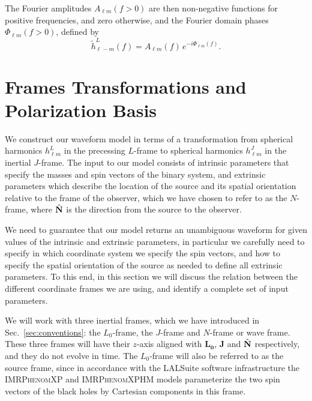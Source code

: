 \documentclass[%
aps,
prd,
amssymb,
amsmath,
amsfonts,
eqsecnum,
showpacs,
nofootinbib,
floatfix,
twocolumn,
twoside,
a4paper,
superscriptaddress
]{revtex4-1}
\newcommand{\hN}{{\hat{\bf{N}}}}
\newcommand{\J}{\mathbf{J}}
\newcommand{\LO}{\mathbf{L_0}}
\newcommand{\phXP}{\textsc{IMRPhenomXP}\xspace}
\newcommand{\phXPHM}{\textsc{IMRPhenomXPHM}\xspace}
\begin{document}
The Fourier amplitudes $A_{\ell m}(f > 0)$ are then non-negative functions for positive frequencies, and zero otherwise, and the Fourier domain phases $\Phi_{\ell m} (f > 0)$, defined by 
\begin{equation}
\tilde{h}_{\ell -m}^L (f) = A_{\ell m} (f) \, e^{-i \Phi_{\ell m} (f)}. 
\end{equation}




\section{Frames Transformations and Polarization Basis}\label{appendix:frames}

We  construct our waveform model in terms of a 
transformation from spherical harmonics $h_{\ell m}^L$ in the precessing $L$-frame to spherical harmonics $h_{\ell m}^J$ in the inertial $J$-frame. 
The input to our model consists of intrinsic parameters that specify the masses and spin vectors of the binary system, and extrinsic parameters which describe the location of the source and its spatial orientation relative to the frame of the observer, which we have chosen to refer to as the $N$-frame, where $\hN$ is the direction from the source to the observer. 

We need to guarantee that our model returns an unambiguous waveform for given values of the intrinsic and extrinsic parameters, in particular we carefully need to specify in which coordinate system we specify the spin vectors, and how to specify the spatial orientation of the source as needed to define all extrinsic parameters. To this end, in this section we will discuss the relation between the different coordinate frames we are using, and identify a complete set of input parameters.

We will work with three inertial frames,
which we have introduced in Sec.~\ref{sec:conventions}:
the $L_0$-frame, the $J$-frame and $N$-frame or wave frame. These three frames will have their $z$-axis aligned with $\LO$,  $\J$ and $\hN$ respectively, and they do not evolve in time. The $L_0$-frame
will also be referred to as the source frame, since in accordance with the LALSuite software infrastructure the \phXP and \phXPHM models parameterize the two spin vectors of the black holes by Cartesian components in this frame.
\end{document}
